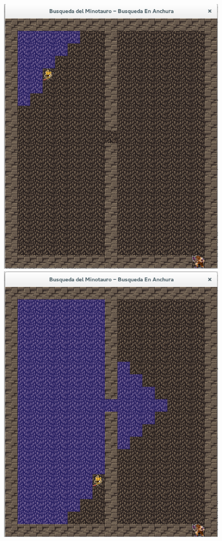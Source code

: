 \documentclass[letter, titlepage, 10pt]{article}
\begin{document}
\begin{appendices}
    \begin{figure}[H]
  \centering
    \begin{minipage}{.5\textwidth}
        \centering
        \includegraphics[width=0.8\linewidth]{images/bea_01_m3}
    \end{minipage}%
    \begin{minipage}{.5\textwidth}
        \centering
        \includegraphics[width=0.8\linewidth]{images/bea_02_m3}
    \end{minipage}
\end{figure}
  

\end{appendices}
\end{document}
